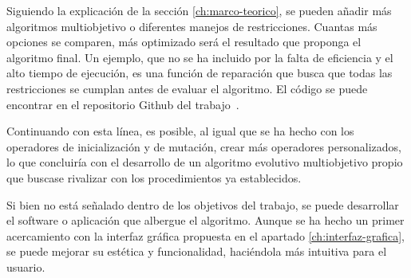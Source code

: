 Siguiendo la explicación de la sección \ref{ch:marco-teorico}, se pueden añadir más algoritmos multiobjetivo o diferentes manejos de restricciones. Cuantas más opciones se comparen, más optimizado será el resultado que proponga el algoritmo final. Un ejemplo, que no se ha incluido por la falta de eficiencia y el alto tiempo de ejecución, es una función de reparación que busca que todas las restricciones se cumplan antes de evaluar el algoritmo. El código se puede encontrar en el repositorio Github del trabajo~\cite{quesada_reparacion}.

Continuando con esta línea, es posible, al igual que se ha hecho con los operadores de inicialización y de mutación, crear más operadores personalizados, lo que concluiría con el desarrollo de un algoritmo evolutivo multiobjetivo propio que buscase rivalizar con los procedimientos ya establecidos.

Si bien no está señalado dentro de los objetivos del trabajo, se puede desarrollar el software o aplicación que albergue el algoritmo. Aunque se ha hecho un primer acercamiento con la interfaz gráfica propuesta en el apartado \ref{ch:interfaz-grafica}, se puede mejorar su estética y funcionalidad, haciéndola más intuitiva para el usuario.